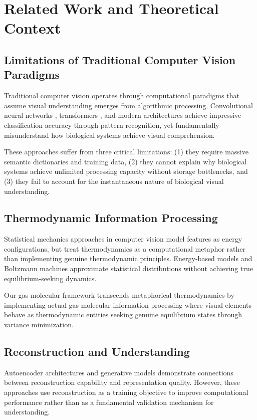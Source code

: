 \documentclass[12pt,a4paper]{article}
\begin{document}
\section{Related Work and Theoretical Context}

\subsection{Limitations of Traditional Computer Vision Paradigms}

Traditional computer vision operates through computational paradigms that assume visual understanding emerges from algorithmic processing. Convolutional neural networks \cite{lecun2015deep}, transformers \cite{vaswani2017attention}, and modern architectures achieve impressive classification accuracy through pattern recognition, yet fundamentally misunderstand how biological systems achieve visual comprehension.

These approaches suffer from three critical limitations: (1) they require massive semantic dictionaries and training data, (2) they cannot explain why biological systems achieve unlimited processing capacity without storage bottlenecks, and (3) they fail to account for the instantaneous nature of biological visual understanding.

\subsection{Thermodynamic Information Processing}

Statistical mechanics approaches in computer vision \cite{lecun2006tutorial, hinton2002training} model features as energy configurations, but treat thermodynamics as a computational metaphor rather than implementing genuine thermodynamic principles. Energy-based models and Boltzmann machines approximate statistical distributions without achieving true equilibrium-seeking dynamics.

Our gas molecular framework transcends metaphorical thermodynamics by implementing actual gas molecular information processing where visual elements behave as thermodynamic entities seeking genuine equilibrium states through variance minimization.

\subsection{Reconstruction and Understanding}

Autoencoder architectures \cite{hinton2006reducing, kingma2013auto} and generative models \cite{goodfellow2014generative} demonstrate connections between reconstruction capability and representation quality. However, these approaches use reconstruction as a training objective to improve computational performance rather than as a fundamental validation mechanism for understanding.
\end{document}

